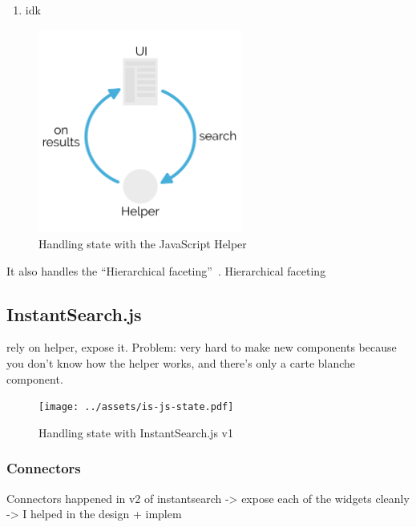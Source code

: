 \begin{enumerate}
  \item idk %
\end{enumerate}

\begin{figure}[H]
\label{figure:js-helper-state}
  \centering
  \includegraphics[width=0.6\textwidth]{../assets/helper-cycle.pdf}
  \caption{Handling state with the JavaScript Helper\cite{js-helper-concepts}}
\end{figure}

It also handles the ``Hierarchical faceting''\cite{hierarchical-faceting}~. Hierarchical faceting %


\subsection{InstantSearch.js} %
\label{sub:instantsearch_js}

rely on helper, expose it. Problem: very hard to make new components because you don't know how the helper works, and there's only a carte blanche component. %

\begin{figure}[H]
\label{figure:is-js-state}
  \centering
  \texttt{[image: ../assets/is-js-state.pdf]}
  \caption{Handling state with InstantSearch.js v1}
\end{figure}

\subsubsection{Connectors} %
\label{ssub:instantsearch_js_connectors}

Connectors happened in v2 of instantsearch
-> expose each of the widgets cleanly
-> I helped in the design + implem %

